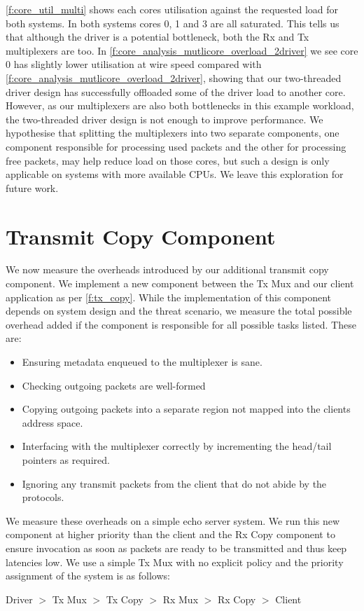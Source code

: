 \autoref{f:core_util_multi} shows each cores utilisation against the requested load for both systems. 
In both systems cores 0, 1 and 3 are all saturated. This tells us that although the driver is a potential
bottleneck, both the Rx and Tx multiplexers are too. In \autoref{f:core_analysis_mutlicore_overload_2driver}
we see core 0 has slightly lower utilisation at wire speed compared with
\autoref{f:core_analysis_mutlicore_overload_2driver}, showing that our two-threaded driver design has successfully
offloaded some of the driver load to another core. However, as our multiplexers are also both bottlenecks in 
this example workload, the two-threaded driver design is not enough to improve performance. We hypothesise that
splitting the multiplexers into two separate components, one component responsible for processing used packets and 
the other for processing free packets, may help reduce load on those cores, but such a design is only applicable
on systems with more available CPUs. We leave this exploration for future work.

\section{Transmit Copy Component}

We now measure the overheads introduced by our additional transmit copy component. We implement a new
component between the Tx Mux and our client application as per \autoref{f:tx_copy}. While the implementation
of this component depends on system design and the threat scenario, we measure the total possible overhead
added if the component is responsible for all possible tasks listed. These are:
\begin{itemize}
    \item Ensuring metadata enqueued to the multiplexer is sane.
    \item Checking outgoing packets are well-formed 
    \item Copying outgoing packets into a separate region not mapped
          into the clients address space.
    \item Interfacing with the multiplexer correctly by incrementing the head/tail pointers as required.
    \item Ignoring any transmit packets from the client that do not abide by the protocols.
\end{itemize}

We measure these overheads on a simple echo server system. We run this new component at higher priority than the client
and the Rx Copy component to ensure invocation as soon as packets are ready to be transmitted and thus keep
latencies low. We use a simple Tx Mux with no explicit policy and the priority assignment of the system is as follows:\\
\centerline{Driver \(>\) Tx Mux  \(>\) Tx Copy \(>\) Rx Mux \(>\) Rx Copy \(>\) Client}

